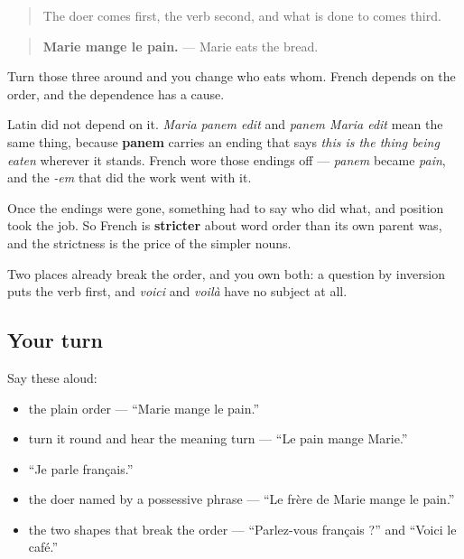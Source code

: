 \begin{cousinweb}
\begin{quote}
The doer comes first, the verb second, and what is done to comes third.
\end{quote}

\begin{quote}
\textbf{Marie mange le pain.} — Marie eats the bread.
\end{quote}

Turn those three around and you change who eats whom. French depends on the order, and the dependence has a cause.

Latin did not depend on it. \emph{Maria panem edit} and \emph{panem Maria edit} mean the same thing, because \textbf{panem} carries an ending that says \emph{this is the thing being eaten} wherever it stands. French wore those endings off — \emph{panem} became \emph{pain}, and the \emph{-em} that did the work went with it.

Once the endings were gone, something had to say who did what, and position took the job. So French is \textbf{stricter} about word order than its own parent was, and the strictness is the price of the simpler nouns.

Two places already break the order, and you own both: a question by inversion puts the verb first, and \emph{voici} and \emph{voilà} have no subject at all.
\end{cousinweb}

\subsection*{Your turn}
Say these aloud:

\begin{itemize}
\raggedright
  \item the plain order — \textquotedblleft{}Marie mange le pain.\textquotedblright{}
  \item turn it round and hear the meaning turn — \textquotedblleft{}Le pain mange Marie.\textquotedblright{}
  \item \textquotedblleft{}Je parle français.\textquotedblright{}
  \item the doer named by a possessive phrase — \textquotedblleft{}Le frère de Marie mange le pain.\textquotedblright{}
  \item the two shapes that break the order — \textquotedblleft{}Parlez-vous français ?\textquotedblright{} and \textquotedblleft{}Voici le café.\textquotedblright{}
\end{itemize}

